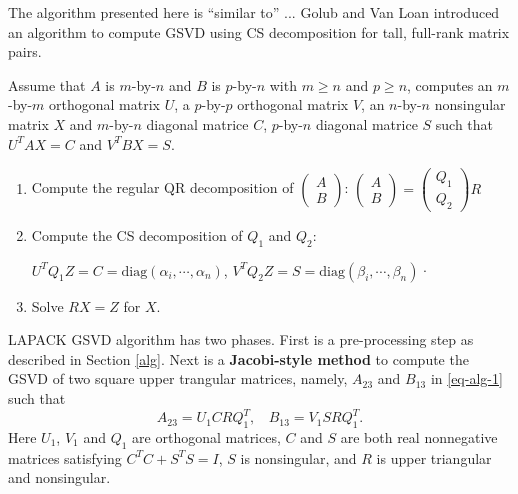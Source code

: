 \begin{remark}
{\rm The algorithm presented here is ``similar to'' ...  
Golub and Van Loan \cite[pp.~502--503]{golub2013matrix} 
introduced an algorithm to compute GSVD using CS decomposition for tall, full-rank matrix pairs.

Assume that $A$ is $m$-by-$n$ and $B$ is $p$-by-$n$ with $m \geq n$ and $p \geq n$, computes an $m$-by-$m$ orthogonal matrix $U$, a $p$-by-$p$ orthogonal matrix $V$, an $n$-by-$n$ nonsingular matrix $X$ and $m$-by-$n$ diagonal matrice $C$, $p$-by-$n$ diagonal matrice $S$ such that $U^{T}AX = C$ and $V^{T}BX = S$.
\begin{enumerate}
\item Compute the regular QR decomposition of $\begin{pmatrix} A\\ B\end{pmatrix}$:
        $\begin{pmatrix}
        A \\
        B
       \end{pmatrix}  = \begin{pmatrix}
        Q_1 \\
        Q_2
       \end{pmatrix}R$

       \item Compute the CS decomposition of $Q_1$ and $Q_2$:

        $U^{T}Q_1Z = C = \mbox{diag}(\alpha_i, \cdots, \alpha_n)$,
        $V^{T}Q_2Z = S = \mbox{diag}(\beta_i, \cdots, \beta_n)$·

        \item Solve $RX = Z$ for $X$.
    \end{enumerate}
}\end{remark} 

\begin{remark} 
{\rm 
LAPACK GSVD  algorithm \cite[pp.~51--53]{anderson1999lapack} has two phases.  First is a pre-processing step as described in Section \ref{alg}. 
Next is a {\bf Jacobi-style method} 
\cite{paige1986computing,bai1993computing} to compute the GSVD 
of two square upper trangular matrices, namely, 
$A_{23}$ and $B_{13}$ in \eqref{eq-alg-1} such that
\begin{equation} \label{eq-alg-jacobi}
A_{23} = U_1CRQ_1^{T},\ \ \ \ B_{13} = V_1SRQ_1^{T}.
\end{equation}
Here $U_1$, $V_1$ and $Q_1$ are orthogonal matrices, $C$ and $S$ are 
both real nonnegative matrices satisfying $C^TC + S^TS = I$, 
$S$ is nonsingular, and $R$ is upper triangular and nonsingular.
} \end{remark} 

